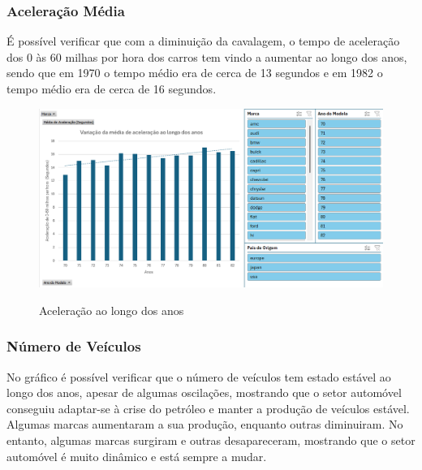 \documentclass[a4paper]{article}
\begin{document}
\subsubsection{Aceleração Média}
É possível verificar que com a diminuição da cavalagem, o tempo de aceleração dos 0 às 60 milhas por hora dos carros tem vindo a 
aumentar ao longo dos anos, sendo que em 1970 o tempo médio era de cerca de 13 segundos e em 1982 o tempo médio
era de cerca de 16 segundos.
\begin{figure}[h!]
    \centering
    \includegraphics[width=1\textwidth]{Recursos/AceleraçãoMediaGrafico.png} %
    \vspace{0.5cm}
    \label{fig:accmg}
    \caption{Aceleração ao longo dos anos}
\end{figure}
\newpage
\subsubsection{Número de Veículos}
No gráfico é possível verificar que o número de veículos tem estado estável ao longo dos anos, apesar de 
algumas oscilações, mostrando que o setor automóvel conseguiu adaptar-se à crise do petróleo e manter a produção
de veículos estável. Algumas marcas aumentaram a sua produção, enquanto outras diminuiram.
No entanto, algumas marcas surgiram e outras desapareceram, mostrando que o setor automóvel é muito dinâmico e
está sempre a mudar.
\end{document}
